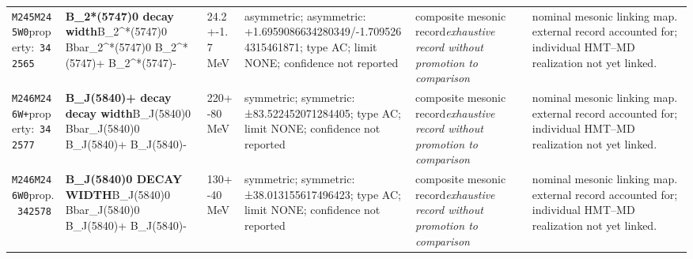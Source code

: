 \begin{landscape}
\begin{longtable}{L{1.85cm}L{4.45cm}L{2.35cm}L{4.05cm}L{3.35cm}L{7.15cm}}
\texttt{M245}\newline \texttt{M245W0}\newline property:\ \texttt{342565} & \textbf{B\_\allowbreak{}2*(5747)0 decay width}\newline B\_\allowbreak{}2\textasciicircum{}*(5747)0 \textbar{}\allowbreak{} Bbar\_\allowbreak{}2\textasciicircum{}*(5747)0 \textbar{}\allowbreak{} B\_\allowbreak{}2\textasciicircum{}*(5747)+ \textbar{}\allowbreak{} B\_\allowbreak{}2\textasciicircum{}*(5747)- & 24.2+-1.7\,MeV & asymmetric; asymmetric: +1.6959086634280349/-1.7095264315461871; type AC; limit NONE; confidence not reported & composite mesonic record\newline \emph{exhaustive record without promotion to comparison} & nominal mesonic linking map. external record accounted for; individual HMT--MD realization not yet linked. \\
\texttt{M246}\newline \texttt{M246W+}\newline property:\ \texttt{342577} & \textbf{B\_\allowbreak{}J(5840)+ decay decay width}\newline B\_\allowbreak{}J(5840)0 \textbar{}\allowbreak{} Bbar\_\allowbreak{}J(5840)0 \textbar{}\allowbreak{} B\_\allowbreak{}J(5840)+ \textbar{}\allowbreak{} B\_\allowbreak{}J(5840)- & 220+-80\,MeV & symmetric; symmetric: ±83.522452071284405; type AC; limit NONE; confidence not reported & composite mesonic record\newline \emph{exhaustive record without promotion to comparison} & nominal mesonic linking map. external record accounted for; individual HMT--MD realization not yet linked. \\
\texttt{M246}\newline \texttt{M246W0}\newline prop.\ \texttt{342578} & \textbf{B\_\allowbreak{}J(5840)0 DECAY WIDTH}\newline B\_\allowbreak{}J(5840)0 \textbar{}\allowbreak{} Bbar\_\allowbreak{}J(5840)0 \textbar{}\allowbreak{} B\_\allowbreak{}J(5840)+ \textbar{}\allowbreak{} B\_\allowbreak{}J(5840)- & 130+-40\,MeV & symmetric; symmetric: ±38.013155617496423; type AC; limit NONE; confidence not reported & composite mesonic record\newline \emph{exhaustive record without promotion to comparison} & nominal mesonic linking map. external record accounted for; individual HMT--MD realization not yet linked. \\

\end{longtable}
\end{landscape}
